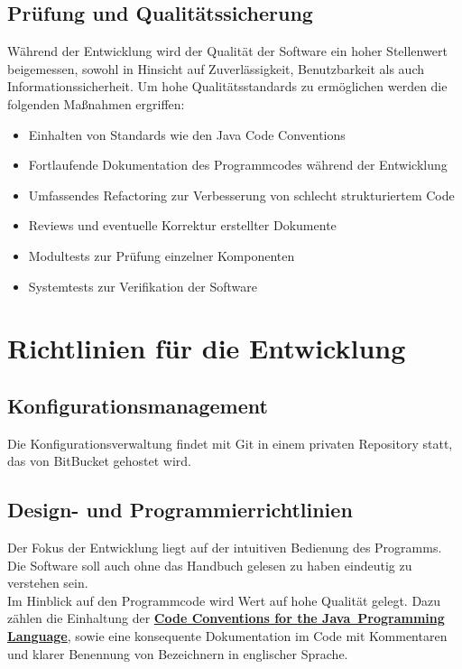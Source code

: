 \documentclass[11pt]{article}
\begin{document}
\subsection{Prüfung und Qualitätssicherung}

Während der Entwicklung wird der Qualität der Software ein hoher Stellenwert beigemessen, sowohl in Hinsicht auf Zuverlässigkeit, Benutzbarkeit als auch Informationssicherheit. Um hohe Qualitätsstandards zu ermöglichen werden die folgenden Maßnahmen ergriffen:
\begin{itemize}
	\item Einhalten von Standards wie den Java Code Conventions
	\item Fortlaufende Dokumentation des Programmcodes während der Entwicklung
	\item Umfassendes Refactoring zur Verbesserung von schlecht strukturiertem Code
	\item Reviews und eventuelle Korrektur erstellter Dokumente
	\item Modultests zur Prüfung einzelner Komponenten
	\item Systemtests zur Verifikation der Software
\end{itemize}

\newpage

\section{Richtlinien für die Entwicklung}

\subsection{Konfigurationsmanagement}

Die Konfigurationsverwaltung findet mit Git in einem privaten Repository statt, das von BitBucket gehostet wird.

\subsection{Design- und Programmierrichtlinien}

Der Fokus der Entwicklung liegt auf der intuitiven Bedienung des Programms. Die Software soll auch ohne das Handbuch gelesen zu haben eindeutig zu verstehen sein.\\
Im Hinblick auf den Programmcode wird Wert auf hohe Qualität gelegt. Dazu zählen die Einhaltung der \href{http://www.oracle.com/technetwork/java/codeconvtoc-136057.html}{\textbf{Code Conventions for the Java\texttrademark\ Programming Language}}, sowie eine konsequente Dokumentation im Code mit Kommentaren und klarer Benennung von Bezeichnern in englischer Sprache.
\end{document}
